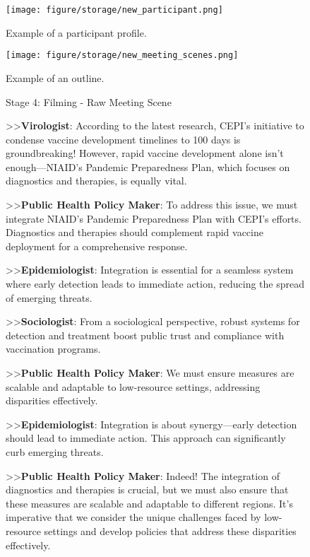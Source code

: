 \begin{figure*}
    \centering
    \texttt{[image: figure/storage/new\_participant.png]}
    \caption{Example of a participant profile.}
    \label{fig:participant_figure}
\end{figure*}


\begin{figure*}
    \centering
    \texttt{[image: figure/storage/new\_meeting\_scenes.png]}
    \caption{Example of an outline.}
    \label{fig:outline_figure}
\end{figure*}


\begin{figure*}[t]
    \begin{AIbox}{Stage 4: Filming - Raw Meeting Scene}
    \parbox[t]{\textwidth}{
    >>\textbf{Virologist}: According to the latest research, CEPI's initiative to condense vaccine development timelines to 100 days is groundbreaking! However, rapid vaccine development alone isn't enough—NIAID's Pandemic Preparedness Plan, which focuses on diagnostics and therapies, is equally vital.
    
    >>\textbf{Public Health Policy Maker}: To address this issue, we must integrate NIAID's Pandemic Preparedness Plan with CEPI's efforts. Diagnostics and therapies should complement rapid vaccine deployment for a comprehensive response.
    
    >>\textbf{Epidemiologist}: Integration is essential for a seamless system where early detection leads to immediate action, reducing the spread of emerging threats.
    
    >>\textbf{Sociologist}: From a sociological perspective, robust systems for detection and treatment boost public trust and compliance with vaccination programs.
    
    >>\textbf{Public Health Policy Maker}: We must ensure measures are scalable and adaptable to low-resource settings, addressing disparities effectively.
    
    >>\textbf{Epidemiologist}: Integration is about synergy—early detection should lead to immediate action. This approach can significantly curb emerging threats.

    >>\textbf{Public Health Policy Maker}: Indeed! The integration of diagnostics and therapies is crucial, but we must also ensure that these measures are scalable and adaptable to different regions. It's imperative that we consider the unique challenges faced by low-resource settings and develop policies that address these disparities effectively.
    
}
\end{AIbox}
\end{figure*}
